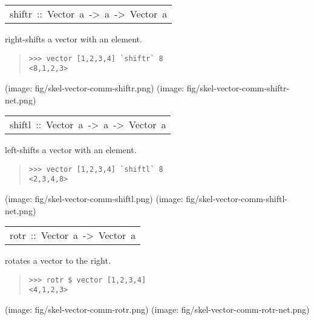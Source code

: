 \begin{haddockdesc}
\item[\begin{tabular}{@{}l}
shiftr\ ::\ Vector\ a\ ->\ a\ ->\ Vector\ a
\end{tabular}]\haddockbegindoc
right-shifts a vector with an element.\par
\begin{quote}
{\haddockverb\begin{verbatim}
>>> vector [1,2,3,4] `shiftr` 8
<8,1,2,3>

\end{verbatim}}
\end{quote}(image: fig/skel-vector-comm-shiftr.png)
 (image: fig/skel-vector-comm-shiftr-net.png)\par
           
\end{haddockdesc}
\begin{haddockdesc}
\item[\begin{tabular}{@{}l}
shiftl\ ::\ Vector\ a\ ->\ a\ ->\ Vector\ a
\end{tabular}]\haddockbegindoc
left-shifts a vector with an element.\par
\begin{quote}
{\haddockverb\begin{verbatim}
>>> vector [1,2,3,4] `shiftl` 8
<2,3,4,8>

\end{verbatim}}
\end{quote}(image: fig/skel-vector-comm-shiftl.png)
 (image: fig/skel-vector-comm-shiftl-net.png)\par
           
\end{haddockdesc}
\begin{haddockdesc}
\item[\begin{tabular}{@{}l}
rotr\ ::\ Vector\ a\ ->\ Vector\ a
\end{tabular}]\haddockbegindoc
rotates a vector to the right.\par
\begin{quote}
{\haddockverb\begin{verbatim}
>>> rotr $ vector [1,2,3,4]
<4,1,2,3>

\end{verbatim}}
\end{quote}(image: fig/skel-vector-comm-rotr.png)
 (image: fig/skel-vector-comm-rotr-net.png)\par
           
\end{haddockdesc}
